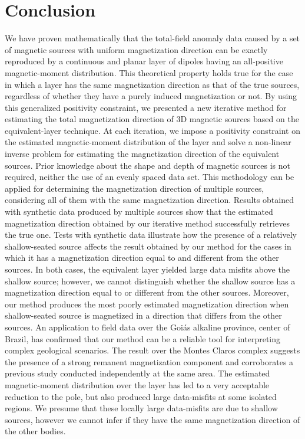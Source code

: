 \section{Conclusion}
\label{sec:conclusion}

We have proven mathematically that the total-field anomaly data caused by a set of magnetic sources
with uniform magnetization direction can be exactly reproduced by a continuous and planar layer of 
dipoles having an all-positive magnetic-moment distribution. 
This theoretical property holds true for the case in which a layer has the same
magnetization direction as that of the true sources, regardless of whether they have 
a purely induced magnetization or not.
By using this generalized positivity constraint, we presented a new iterative method for 
estimating the total magnetization direction of 3D magnetic sources based on the equivalent-layer technique. 
At each iteration, we impose a positivity constraint on the estimated magnetic-moment distribution of the layer 
and solve a non-linear inverse problem for estimating the magnetization direction of the equivalent sources. 
Prior knowledge about the shape and depth of magnetic sources is not required, neither the use of an evenly spaced 
data set. This methodology can be applied for determining the magnetization direction of multiple sources, 
considering all of them with the same magnetization direction. 
Results obtained with synthetic data produced by multiple sources show that the estimated magnetization direction 
obtained by our iterative method successfully retrieves the true one.
Tests with synthetic data illustrate how the presence of a relatively shallow-seated source affects the 
result obtained by our method for the cases in which it has a magnetization direction equal to and different from 
the other sources. In both cases, the equivalent layer yielded large data misfits above the shallow source;
however, we cannot distinguish whether the shallow source has a magnetization direction equal to or different from the other sources. 
Moreover, our method produces the most poorly estimated magnetization direction when shallow-seated source is magnetized in a 
direction that differs from the other sources.
An application to field data over the Goi{\' a}s alkaline province, center of Brazil, has confirmed that our method can 
be a reliable tool for interpreting complex geological scenarios. The result over the Montes Claros complex suggests the presence 
of a strong remanent magnetization component and corroborates a previous study conducted independently at the same area. 
The estimated magnetic-moment distribution over the layer has led to a very acceptable reduction to the pole, but also 
produced large data-misfits at some isolated regions. We presume that these locally large data-misfits are due to shallow sources, 
however we cannot infer if they have the same magnetization direction of the other bodies.   
